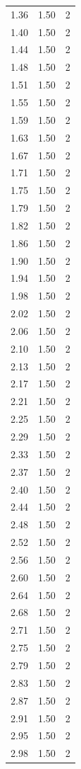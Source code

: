 \begin{longtable}{lrr}
  1.36 & 1.50 & 2 \\
  1.40 & 1.50 & 2 \\
  1.44 & 1.50 & 2 \\
  1.48 & 1.50 & 2 \\
  1.51 & 1.50 & 2 \\
  1.55 & 1.50 & 2 \\
  1.59 & 1.50 & 2 \\
  1.63 & 1.50 & 2 \\
  1.67 & 1.50 & 2 \\
  1.71 & 1.50 & 2 \\
  1.75 & 1.50 & 2 \\
  1.79 & 1.50 & 2 \\
  1.82 & 1.50 & 2 \\
  1.86 & 1.50 & 2 \\
  1.90 & 1.50 & 2 \\
  1.94 & 1.50 & 2 \\
  1.98 & 1.50 & 2 \\
  2.02 & 1.50 & 2 \\
  2.06 & 1.50 & 2 \\
  2.10 & 1.50 & 2 \\
  2.13 & 1.50 & 2 \\
  2.17 & 1.50 & 2 \\
  2.21 & 1.50 & 2 \\
  2.25 & 1.50 & 2 \\
  2.29 & 1.50 & 2 \\
  2.33 & 1.50 & 2 \\
  2.37 & 1.50 & 2 \\
  2.40 & 1.50 & 2 \\
  2.44 & 1.50 & 2 \\
  2.48 & 1.50 & 2 \\
  2.52 & 1.50 & 2 \\
  2.56 & 1.50 & 2 \\
  2.60 & 1.50 & 2 \\
  2.64 & 1.50 & 2 \\
  2.68 & 1.50 & 2 \\
  2.71 & 1.50 & 2 \\
  2.75 & 1.50 & 2 \\
  2.79 & 1.50 & 2 \\
  2.83 & 1.50 & 2 \\
  2.87 & 1.50 & 2 \\
  2.91 & 1.50 & 2 \\
  2.95 & 1.50 & 2 \\
  2.98 & 1.50 & 2 \\

\end{longtable}
